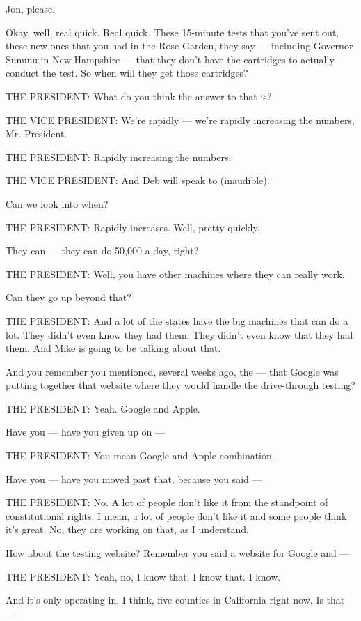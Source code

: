 Jon, please.

Okay, well, real quick. Real quick. These 15-minute tests that you've
sent out, these new ones that you had in the Rose Garden, they say ---
including Governor Sununu in New Hampshire --- that they don't have the
cartridges to actually conduct the test. So when will they get those
cartridges?

THE PRESIDENT: What do you think the answer to that is?

THE VICE PRESIDENT: We're rapidly --- we're rapidly increasing the
numbers, Mr. President.

THE PRESIDENT: Rapidly increasing the numbers.

THE VICE PRESIDENT: And Deb will speak to (inaudible).

Can we look into when?

THE PRESIDENT: Rapidly increases. Well, pretty quickly.

They can --- they can do 50,000 a day, right?

THE PRESIDENT: Well, you have other machines where they can really work.

Can they go up beyond that?

THE PRESIDENT: And a lot of the states have the big machines that can do
a lot. They didn't even know they had them. They didn't even know that
they had them. And Mike is going to be talking about that.

And you remember you mentioned, several weeks ago, the --- that Google
was putting together that website where they would handle the
drive-through testing?

THE PRESIDENT: Yeah. Google and Apple.

Have you --- have you given up on ---

THE PRESIDENT: You mean Google and Apple combination.

Have you --- have you moved past that, because you said ---

THE PRESIDENT: No. A lot of people don't like it from the standpoint of
constitutional rights. I mean, a lot of people don't like it and some
people think it's great. No, they are working on that, as I understand.

How about the testing website? Remember you said a website for Google
and ---

THE PRESIDENT: Yeah, no, I know that. I know that. I know.

And it's only operating in, I think, five counties in California right
now. Is that ---

